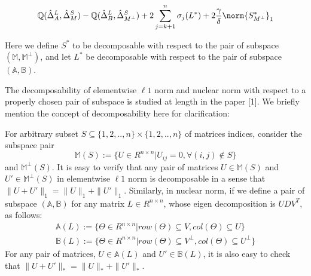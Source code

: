 \documentclass{article}
\begin{document}
\begin{equation}\label{eq:5}
\mathbb{Q}(\hat{\Delta}^L_{A},\hat{\Delta}^S_{M}) - \mathbb{Q}(\hat{\Delta}^L_{B},\hat{\Delta}^S_{M^\perp}) + 2 \sum_{j=k+1}^{n} \sigma_{j}(L^*) + 2\frac{\gamma}{\delta}\norm{S^*_{M^{\perp}}}_{1}
\end{equation}

Here we define $S^{*}$ to be decomposable with respect to the pair of subspace $(\mathbb{M},\mathbb{M}^{\perp})$, and let $L^{*}$ be decomposable with respect to the pair of subspace $(\mathbb{A},\mathbb{B})$. 

The decomposability of elementwise $\ell 1$ norm and nuclear norm with respect to a properly chosen pair of subspace is studied at length in the paper [1]. We briefly mention the concept of decomposability here for clarification:

For arbitrary subset $S \subseteq \{1,2,..,n\} \times \{1,2,..,n\}$ of matrices indices, consider the subspace pair 
\[
    \mathbb{M}(S) := \{U\in R^{n \times n} | U_{ij} = 0, \forall (i,j) \not\in S \}
\]
and $\mathbb{M}^\perp(S)$. It is easy to verify that any pair of matrices $U\in \mathbb{M}(S)$ and $U' \in \mathbb{M}^\perp(S)$ in elementwise $\ell 1$ norm is decomposable in a sense that $\|U+U'\|_1 = \|U\|_1 + \|U'\|_1$. Similarly, in nuclear norm, if we define a pair of subspace $(\mathbb{A},\mathbb{B})$ for any matrix $L \in R^{n \times n}$, whose eigen decomposition is $UDV^{T}$, as follows:
\begin{align*}
    \mathbb{A}(L) := \{\Theta \in R^{n \times n} | row(\Theta) \subseteq V, col(\Theta) \subseteq U \} \\ 
    \mathbb{B}(L) := \{\Theta \in R^{n \times n} | row(\Theta) \subseteq V^{\perp}, col(\Theta) \subseteq U^{\perp} \} 
\end{align*}
For any pair of matrices, $U\in \mathbb{A}(L)$ and $U' \in \mathbb{B}(L)$, it is also easy to check that $\|U+U'\|_\ast = \|U\|_\ast+\|U'\|_\ast$.
\end{document}
